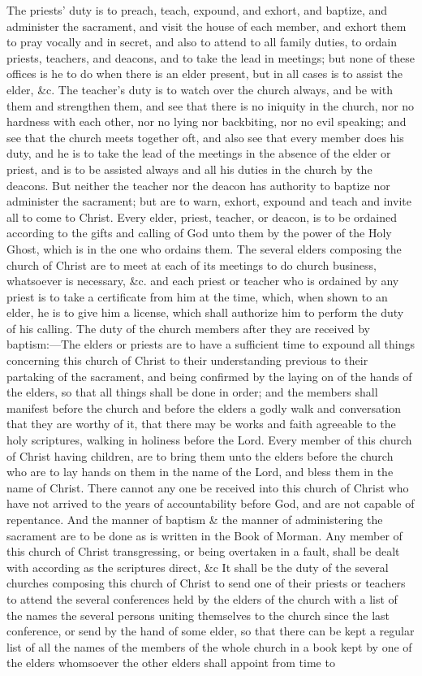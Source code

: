 				The priests' duty is to preach, teach, expound, and exhort, and baptize, and administer the sacrament, and visit the house of each member, and exhort them to pray vocally and in secret, and also to attend to all family duties, to ordain priests, teachers, and deacons, and to take the lead in meetings; but none of these offices is he to do when there is an elder present, but in all cases is to assist the elder, \&c. The teacher's duty is to watch over the church always, and be with them and strengthen them, and see that there is no iniquity in the church, nor no hardness with each other, nor no lying nor backbiting, nor no evil speaking; and see that the church meets together oft, and also see that every member does his duty, and he is to take the lead of the meetings in the absence of the elder or priest, and is to be assisted always and all his duties in the church by the deacons. But neither the teacher nor the deacon has authority to baptize nor administer the sacrament; but are to warn, exhort, expound and teach and invite all to come to Christ. Every elder, priest, teacher, or deacon, is to be ordained according to the gifts and calling of God unto them by the power of the Holy Ghost, which is in the one who ordains them. The several elders composing the church of Christ are to meet at each of its meetings to do church business, whatsoever is necessary, \&c. and each priest or teacher who is ordained by any priest is to take a certificate from him at the time, which, when shown to an elder, he is to give him a license, which shall authorize him to perform the duty of his calling. The duty of the church members after they are received by baptism:---The elders or priests are to have a sufficient time to expound all things concerning this church of Christ to their understanding previous to their partaking of the sacrament, and being confirmed by the laying on of the hands of the elders, so that all things shall be done in order; and the members shall manifest before the church and before the elders a godly walk and conversation that they are worthy of it, that there may be works and faith agreeable to the holy scriptures, walking in holiness before the Lord. Every member of this church of Christ having children, are to bring them unto the elders before the church who are to lay hands on them in the name of the Lord, and bless them in the name of Christ. There cannot any one be received into this church of Christ who have not arrived to the years of accountability before God, and are not capable of repentance. And the manner of baptism \& the manner of administering the sacrament are to be done as is written in the Book of Morman. Any member of this church of Christ transgressing, or being overtaken in a fault, shall be dealt with according as the scriptures direct, \&c It shall be the duty of the several churches composing this church of Christ to send one of their priests or teachers to attend the several conferences held by the elders of the church with a list of the names the several persons uniting themselves to the church since the last conference, or send by the hand of some elder, so that there can be kept a regular list of all the names of the members of the whole church in a book kept by one of the elders whomsoever the other elders shall appoint from time to 